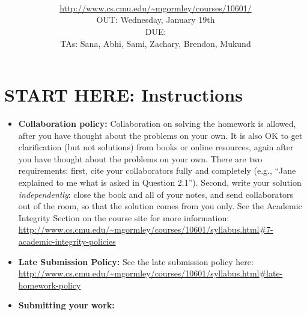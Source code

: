 \documentclass[11pt,addpoints,answers]{exam}
\title{\textsc{\hwName}
} %
\author{\courseName\\
\url{http://www.cs.cmu.edu/~mgormley/courses/10601/} \\
OUT: Wednesday, January 19th \\
DUE: \dueDate{} \\ 
TAs: Sana, Abhi, Sami, Zachary, Brendon, Mukund
}
\date{}
\date{}
\begin{document}
\maketitle

\section*{START HERE: Instructions}
\begin{itemize}
\item \textbf{Collaboration policy:} Collaboration on solving the homework is allowed, after you have thought about the problems on your own. It is also OK to get clarification (but not solutions) from books or online resources, again after you have thought about the problems on your own. There are two requirements: first, cite your collaborators fully and completely (e.g., ``Jane explained to me what is asked in Question 2.1''). Second, write your solution {\em independently}: close the book and all of your notes, and send collaborators out of the room, so that the solution comes from you only.  See the Academic Integrity Section on the course site for more information: \url{http://www.cs.cmu.edu/~mgormley/courses/10601/syllabus.html#7-academic-integrity-policies}

\item\textbf{Late Submission Policy:} See the late submission policy here: \url{http://www.cs.cmu.edu/~mgormley/courses/10601/syllabus.html#late-homework-policy}

\item\textbf{Submitting your work:} 

\begin{itemize}



\end{itemize}
\end{itemize}
\end{document}
